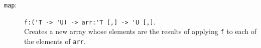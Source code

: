 \documentclass[springer.tex]{subfiles}
\begin{document}
\begin{description}
\item[\texttt{map}:] \lstinline{f:('T -> 'U) -> arr:'T [,] -> 'U [,]}.~\\
  Creates a new array whose elements are the results of applying \lstinline{f} to each of the elements of \lstinline{arr}.
\end{description}
\end{document}
